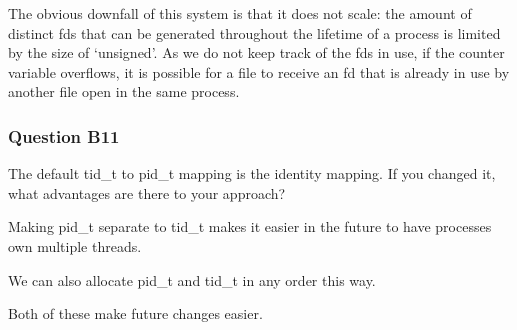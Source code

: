 The obvious downfall of this system is that it does not scale: the amount of distinct fds that can be generated throughout the lifetime of a process is limited by the size of `unsigned'. As we do not keep track of the fds in use, if the counter variable overflows, it is possible for a file to receive an fd that is already in use by another file open in the same process.


\subsubsection*{Question B11} %
The default tid\_t to pid\_t mapping is the identity mapping. If you changed it, what advantages are there to your approach?

Making pid\_t separate to tid\_t makes it easier in the future to have processes own multiple threads.

We can also allocate pid\_t and tid\_t in any order this way.

Both of these make future changes easier.

